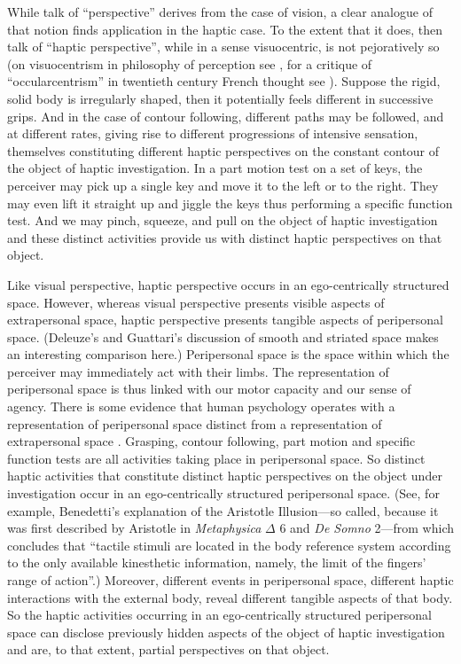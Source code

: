 While talk of ``perspective'' derives from the case of vision, a clear analogue of that notion finds application in the haptic case. To the extent that it does, then talk of ``haptic perspective'', while in a sense visuocentric, is not pejoratively so (on visuocentrism in philosophy of perception see \citealt{OCallaghan:2007xy}, for a critique of ``occularcentrism'' in twentieth century French thought see \citealt{Jay:1994aa}). Suppose the rigid, solid body is irregularly shaped, then it potentially feels different in successive grips. And in the case of contour following, different paths may be followed, and at different rates, giving rise to different progressions of intensive sensation, themselves constituting different haptic perspectives on the constant contour of the object of haptic investigation. In a part motion test on a set of keys, the perceiver may pick up a single key and move it to the left or to the right. They may even lift it straight up and jiggle the keys thus performing a specific function test. And we may pinch, squeeze, and pull on the object of haptic investigation and these distinct activities provide us with distinct haptic perspectives on that object. 

Like visual perspective, haptic perspective occurs in an ego-centrically structured space. However, whereas visual perspective presents visible aspects of extrapersonal space, haptic perspective presents tangible aspects of peripersonal space. (Deleuze's and Guattari's \citeyear[chapter 14]{Deleuze:1987rr} discussion of smooth and striated space makes an interesting comparison here.) Peripersonal space is the space within which the perceiver may immediately act with their limbs. The representation of peripersonal space is thus linked with our motor capacity and our sense of agency. There is some evidence that human psychology operates with a representation of peripersonal space distinct from a representation of extrapersonal space \citep{Halligan:1991yf}. Grasping, contour following, part motion and specific function tests are all activities taking place in peripersonal space. So distinct haptic activities that constitute distinct haptic perspectives on the object under investigation occur in an ego-centrically structured peripersonal space. (See, for example, Benedetti's \citeyear{Benedetti:1985qe} explanation of the Aristotle Illusion---so called, because it was first described by Aristotle in \emph{Metaphysica} \( \Delta \) 6 and \emph{De Somno} 2---from which \citealt[524]{Benedetti:1985qe} concludes that ``tactile stimuli are located in the body reference system according to the only available kinesthetic information, namely, the limit of the fingers' range of action''.) Moreover, different events in peripersonal space, different haptic interactions with the external body, reveal different tangible aspects of that body. So the haptic activities occurring in an ego-centrically structured peripersonal space can disclose previously hidden aspects of the object of haptic investigation and are, to that extent, partial perspectives on that object.

